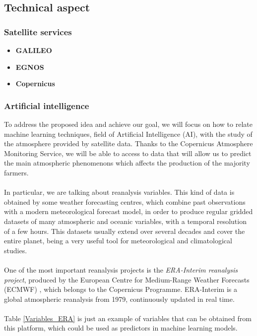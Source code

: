 
\newpage
\subsection{Technical aspect}
\subsubsection{Satellite services}
\begin{itemize}
    \item \textbf{GALILEO}
    \item \textbf{EGNOS}
    \item \textbf{Copernicus}
    
\end{itemize}
\subsubsection{Artificial intelligence}
To address the proposed idea and achieve our goal, we will focus on how to relate machine learning techniques, field of Artificial Intelligence (AI), with the study of the atmosphere provided by satellite data. Thanks to the Copernicus Atmosphere Monitoring Service, we will be able to access to data that will allow us to predict the main atmospheric phenomenons which affects the production of the majority farmers.\\\\
%
In particular, we are talking about reanalysis variables. This kind of data is obtained by some weather forecasting centres, which combine past observations with a modern meteorological forecast model, in order to produce regular gridded datasets of many atmospheric and oceanic variables, with a temporal resolution of a few hours. This datasets usually extend over several decades and cover the entire planet, being a very useful tool for meteorological and climatological studies.\\\\
%
One of the most important reanalysis projects is the {\em ERA-Interim reanalysis project}, produced by the European Centre for Medium-Range Weather Forecasts (ECMWF) \cite{ERA_Interim}, which belongs to the Copernicus Programme. ERA-Interim is a global atmospheric reanalysis from 1979, continuously updated in real time.\\\\
%
Table \ref{Variables_ERA} is just an example of variables that can be obtained from this platform, which could be used as predictors in machine learning models.

